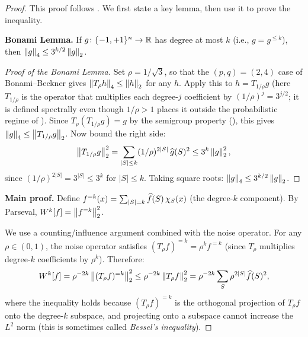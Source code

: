 \begin{proof}
This proof follows \citet[Theorem~9.24]{odonnell2014analysis}.
We first state a key lemma, then use it to prove the inequality.

\textbf{Bonami Lemma.}
If $g \colon \{-1,+1\}^n \to \mathbb{R}$ has degree at most $k$ (i.e., $g = g^{\leq k}$), then
$\left\| g \right\|_4 \leq 3^{k/2} \left\| g \right\|_2$.

\begin{proof}[Proof of the Bonami Lemma]
Set $\rho = 1/\sqrt{3}$, so that the $(p,q) = (2,4)$ case of
Bonami--Beckner gives $\left\| T_\rho h \right\|_4 \leq \left\| h \right\|_2$ for any
$h$. Apply this to $h = T_{1/\rho} g$ (here $T_{1/\rho}$ is the
operator that multiplies each degree-$j$ coefficient by
$(1/\rho)^j = 3^{j/2}$; it is defined spectrally even though
$1/\rho > 1$ places it outside the probabilistic regime of
). Since $T_\rho(T_{1/\rho} g) = g$ by the
semigroup property (), this gives
$\left\| g \right\|_4 \leq \left\| T_{1/\rho} g \right\|_2$. Now bound the right side:
\[
  \left\| T_{1/\rho} g \right\|_2^2
  = \sum_{|S| \leq k} (1/\rho)^{2|S|}\, \widehat{g}(S)^2
  \leq 3^k \left\| g \right\|_2^2,
\]
since $(1/\rho)^{2|S|} = 3^{|S|} \leq 3^k$ for $|S| \leq k$.
Taking square roots: $\left\| g \right\|_4 \leq 3^{k/2} \left\| g \right\|_2$.
\end{proof}

\textbf{Main proof.} Define $f^{=k}(x) = \sum_{|S|=k} \widehat{f}(S)\,\chi_S(x)$
(the degree-$k$ component). By Parseval, $W^k[f] = \left\| f^{=k} \right\|_2^2$.

We use a counting/influence argument combined with the noise operator.
For any $\rho \in (0,1)$, the noise operator satisfies
$(T_\rho f)^{=k} = \rho^k f^{=k}$ (since $T_\rho$ multiplies degree-$k$
coefficients by $\rho^k$). Therefore:
\begin{equation}\label{eq:level-k-step1}
  W^k[f] = \rho^{-2k} \left\| (T_\rho f)^{=k} \right\|_2^2
  \leq \rho^{-2k} \left\| T_\rho f \right\|_2^2
  = \rho^{-2k} \sum_S \rho^{2|S|} \widehat{f}(S)^2,
\end{equation}
where the inequality holds because $(T_\rho f)^{=k}$ is the
orthogonal projection of $T_\rho f$ onto the degree-$k$ subspace, and
projecting onto a subspace cannot increase the $L^2$ norm (this is
sometimes called \emph{Bessel's inequality}).


\end{proof}
